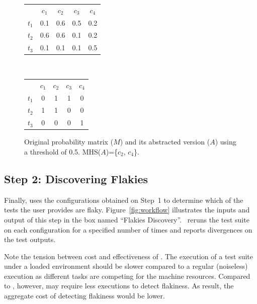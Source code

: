 \documentclass[conference]{IEEEtran}
\begin{document}

\begin{figure}
    \centering
\begin{tabular}{ccccc}
          &  $c_1$  & $c_2$   &  $c_3$  & $c_4$ \\
          \cline{2-5}
    $t_1$ &  0.1    &  0.6    &  0.5    &  0.2  \\
    $t_2$ &  0.6    &  0.6    &  0.1    &  0.2  \\
    $t_3$ &  0.1    &  0.1    &  0.1    &  0.5  \\
     \bottomrule
\end{tabular}
~
\hspace{1ex}
\begin{tabular}{ccccc}
          &  $c_1$  & $c_2$   &  $c_3$  & $c_4$ \\
        \cline{2-5}
    $t_1$ &  0    &  1    &  1    &  0  \\
    $t_2$ &  1    &  1    &  0    &  0  \\
    $t_3$ &  0    &  0    &  0    &  1  \\
     \bottomrule
\end{tabular}
    \caption{Original probability matrix ($M$) and its abstracted version ($A$) using a threshold of 0.5. MHS($A$)=\{$c_2$, $c_4$\}.}
    \label{fig:msh-example}
\end{figure}


\subsection{Step 2: Discovering Flakies}
\label{technique:finding-flakies}


Finally, \tname{} uses the configurations obtained on Step~1 to determine which of the tests the user provides are flaky. Figure~\ref{fig:workflow} illustrates the inputs and output of this step in the box named ``Flakies Discovery''. \tname\ reruns the test suite  on each configuration for a specified number of times and reports divergences on the test outputs. 

Note the tension between cost and effectiveness of \tname. The execution of a test suite under a loaded environment should be slower compared to a regular (noiseless) execution as different tasks are competing for the machine resources. Compared to \rerun{}, however, \tname{} may require less executions to detect flakiness. As result, the aggregate cost of detecting flakiness would be lower. 
\end{document}
